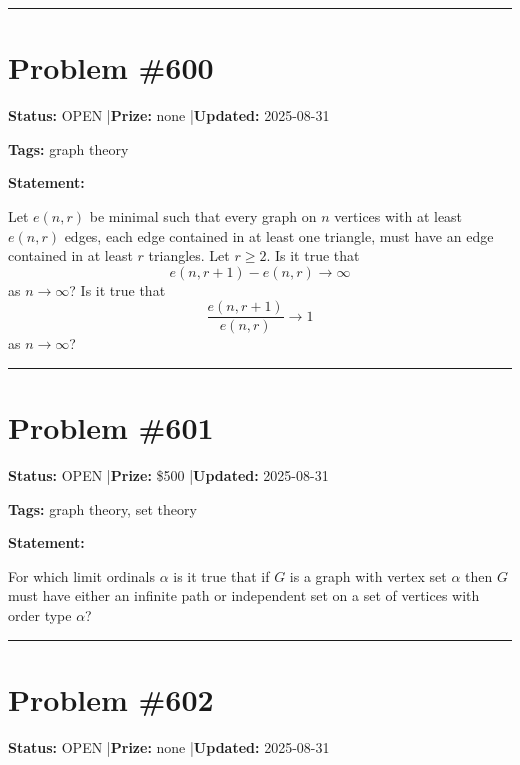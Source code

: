 \documentclass{article}
\begin{document}
\noindent\rule{\linewidth}{0.4pt}


\section{Problem \#600}
\label{prob:600}

\noindent\textbf{Status:} OPEN \quad|\quad \textbf{Prize:} none \quad|\quad \textbf{Updated:} 2025-08-31

\noindent\textbf{Tags:} graph theory

\medskip

\noindent\textbf{Statement:}

Let $e(n,r)$ be minimal such that every graph on $n$ vertices with at least $e(n,r)$ edges, each edge contained in at least one triangle, must have an edge contained in at least $r$ triangles. Let $r\geq 2$. Is it true that\[e(n,r+1)-e(n,r)\to \infty\]as $n\to \infty$? Is it true that\[\frac{e(n,r+1)}{e(n,r)}\to 1\]as $n\to \infty$?

\noindent\rule{\linewidth}{0.4pt}


\section{Problem \#601}
\label{prob:601}

\noindent\textbf{Status:} OPEN \quad|\quad \textbf{Prize:} \$500 \quad|\quad \textbf{Updated:} 2025-08-31

\noindent\textbf{Tags:} graph theory, set theory

\medskip

\noindent\textbf{Statement:}

For which limit ordinals $\alpha$ is it true that if $G$ is a graph with vertex set $\alpha$ then $G$ must have either an infinite path or independent set on a set of vertices with order type $\alpha$?

\noindent\rule{\linewidth}{0.4pt}


\section{Problem \#602}
\label{prob:602}

\noindent\textbf{Status:} OPEN \quad|\quad \textbf{Prize:} none \quad|\quad \textbf{Updated:} 2025-08-31
\end{document}
